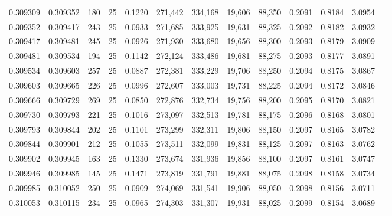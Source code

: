 \begin{tabular}{rrrrrrrrrrrrr}
0.309309 & 0.309352 &   180 &  25 &                                     0.1220 & 271,442 & 334,168 &  19,606 &  88,350 & 0.2091 & 0.8184 & 3.0954 \\
0.309352 & 0.309417 &   243 &  25 &                                     0.0933 & 271,685 & 333,925 &  19,631 &  88,325 & 0.2092 & 0.8182 & 3.0932 \\
0.309417 & 0.309481 &   245 &  25 &                                     0.0926 & 271,930 & 333,680 &  19,656 &  88,300 & 0.2093 & 0.8179 & 3.0909 \\
0.309481 & 0.309534 &   194 &  25 &                                     0.1142 & 272,124 & 333,486 &  19,681 &  88,275 & 0.2093 & 0.8177 & 3.0891 \\
0.309534 & 0.309603 &   257 &  25 &                                     0.0887 & 272,381 & 333,229 &  19,706 &  88,250 & 0.2094 & 0.8175 & 3.0867 \\
0.309603 & 0.309665 &   226 &  25 &                                     0.0996 & 272,607 & 333,003 &  19,731 &  88,225 & 0.2094 & 0.8172 & 3.0846 \\
0.309666 & 0.309729 &   269 &  25 &                                     0.0850 & 272,876 & 332,734 &  19,756 &  88,200 & 0.2095 & 0.8170 & 3.0821 \\
0.309730 & 0.309793 &   221 &  25 &                                     0.1016 & 273,097 & 332,513 &  19,781 &  88,175 & 0.2096 & 0.8168 & 3.0801 \\
0.309793 & 0.309844 &   202 &  25 &                                     0.1101 & 273,299 & 332,311 &  19,806 &  88,150 & 0.2097 & 0.8165 & 3.0782 \\
0.309844 & 0.309901 &   212 &  25 &                                     0.1055 & 273,511 & 332,099 &  19,831 &  88,125 & 0.2097 & 0.8163 & 3.0762 \\
0.309902 & 0.309945 &   163 &  25 &                                     0.1330 & 273,674 & 331,936 &  19,856 &  88,100 & 0.2097 & 0.8161 & 3.0747 \\
0.309946 & 0.309985 &   145 &  25 &                                     0.1471 & 273,819 & 331,791 &  19,881 &  88,075 & 0.2098 & 0.8158 & 3.0734 \\
0.309985 & 0.310052 &   250 &  25 &                                     0.0909 & 274,069 & 331,541 &  19,906 &  88,050 & 0.2098 & 0.8156 & 3.0711 \\
0.310053 & 0.310115 &   234 &  25 &                                     0.0965 & 274,303 & 331,307 &  19,931 &  88,025 & 0.2099 & 0.8154 & 3.0689 \\

\end{tabular}
